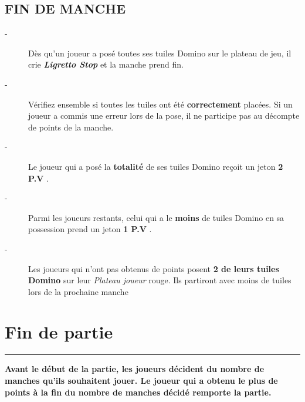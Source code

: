 \documentclass{article}%
\begin{document}
%
\subsection{ FIN DE MANCHE
}%
\label{subsec:FINDEMANCHE}%
\begin{description}%
\item[{-} ]%
%
 Dès qu’un joueur a posé toutes ses tuiles Domino sur le plateau de jeu, il crie %
\textbf{\textit{Ligretto Stop}}%
\textit{ }%
 et la manche prend fin.
%
\item[{-} ]%
%
 Vérifiez ensemble si toutes les tuiles ont été %
\textbf{correctement}%
\textit{ }%
 placées. Si un joueur a commis une erreur lors de la pose, il ne participe pas au décompte de points de la manche.
%
\item[{-} ]%
%
 Le joueur qui a posé la %
\textbf{totalité}%
\textit{ }%
 de ses tuiles Domino reçoit un jeton %
\textbf{2 P.V}%
.
%
\item[{-} ]%
%
 Parmi les joueurs restants, celui qui a le %
\textbf{moins}%
\textit{ }%
 de tuiles Domino en sa possession prend un jeton %
\textbf{1 P.V}%
.
%
\item[{-} ]%
%
 Les joueurs qui n'ont pas obtenus de points posent %
\textbf{2 de leurs tuiles Domino}%
\textit{ }%
 sur leur %
\textit{Plateau joueur}%
\textit{ }%
 rouge. Ils partiront avec moins de tuiles lors de la prochaine manche
%
\end{description}

%
\section{ Fin de partie
}%
\label{sec:Findepartie}%
\rule{18cm}{0.07cm}\break%
\textbf{Avant le début de la partie, les joueurs décident du nombre de manches qu’ils souhaitent jouer. Le joueur qui a obtenu le plus de points à la fin du nombre de manches décidé remporte la partie.}

%
\end{document}
